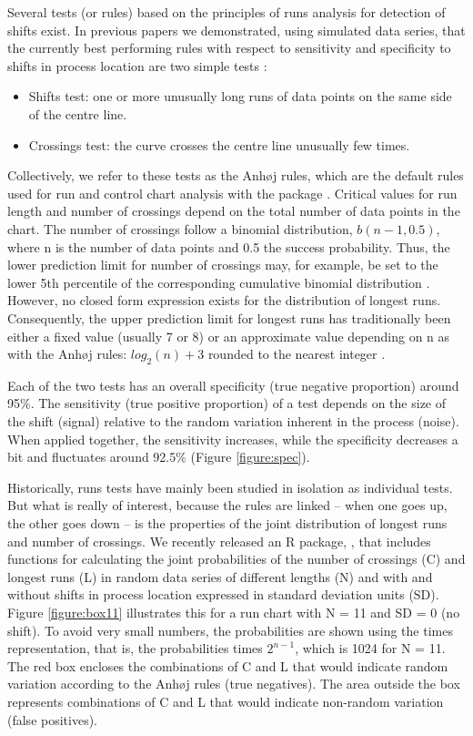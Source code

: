 Several tests (or rules) based on the principles of runs analysis for
detection of shifts exist. In previous papers we demonstrated, using
simulated data series, that the currently best performing rules with
respect to sensitivity and specificity to shifts in process location are
two simple tests \citep{anhoej2014, anhoej2015, anhoej2018}:

\begin{itemize}
\item
  Shifts test: one or more unusually long runs of data points on the
  same side of the centre line.
\item
  Crossings test: the curve crosses the centre line unusually few times.
\end{itemize}

Collectively, we refer to these tests as the Anhøj rules, which are the
default rules used for run and control chart analysis with the
 package \citep{qicharts2}. Critical values for run
length and number of crossings depend on the total number of data points
in the chart. The number of crossings follow a binomial distribution,
\(b(n - 1, 0.5)\), where n is the number of data points and 0.5 the
success probability. Thus, the lower prediction limit for number of
crossings may, for example, be set to the lower 5th percentile of the
corresponding cumulative binomial distribution \citep{chen2010}.
However, no closed form expression exists for the distribution of
longest runs. Consequently, the upper prediction limit for longest runs
has traditionally been either a fixed value (usually 7 or 8)
\citep{carey2002a} or an approximate value depending on n as with the
Anhøj rules: \(log_2(n) + 3\) rounded to the nearest integer
\citep{schilling2012}.

Each of the two tests has an overall specificity (true negative
proportion) around 95\%. The sensitivity (true positive proportion) of a
test depends on the size of the shift (signal) relative to the random
variation inherent in the process (noise). When applied together, the
sensitivity increases, while the specificity decreases a bit and
fluctuates around 92.5\% (Figure \ref{figure:spec}).

Historically, runs tests have mainly been studied in isolation as
individual tests. But what is really of interest, because the rules are
linked -- when one goes up, the other goes down -- is the properties of
the joint distribution of longest runs and number of crossings. We
recently released an R package,  \citep{twl2018}, that
includes functions for calculating the joint probabilities of the number
of crossings (C) and longest runs (L) in random data series of different
lengths (N) and with and without shifts in process location expressed in
standard deviation units (SD). Figure \ref{figure:box11} illustrates
this for a run chart with N = 11 and SD = 0 (no shift). To avoid very
small numbers, the probabilities are shown using the times
representation, that is, the probabilities times \(2^{n-1}\), which is
1024 for N = 11. The red box encloses the combinations of C and L that
would indicate random variation according to the Anhøj rules (true
negatives). The area outside the box represents combinations of C and L
that would indicate non-random variation (false positives).


